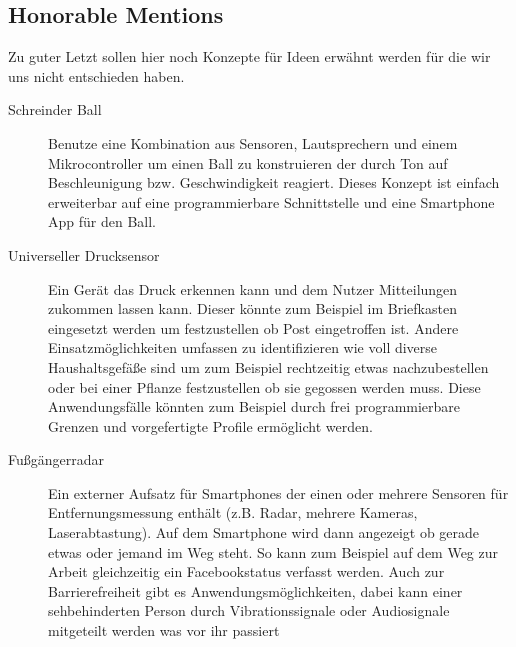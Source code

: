 \subsection{\glqq Honorable Mentions\grqq}
Zu guter Letzt sollen hier noch Konzepte für Ideen erwähnt werden für die wir uns nicht entschieden haben.
\begin{description}
	\item[Schreinder Ball] Benutze eine Kombination aus Sensoren, Lautsprechern und einem Mikrocontroller um einen Ball zu konstruieren der durch Ton auf Beschleunigung bzw. Geschwindigkeit reagiert. Dieses Konzept ist einfach erweiterbar auf eine programmierbare Schnittstelle und eine Smartphone App für den Ball.
	
	\item[Universeller Drucksensor] Ein Gerät das Druck erkennen kann und dem Nutzer Mitteilungen zukommen lassen kann. Dieser könnte zum Beispiel im Briefkasten eingesetzt werden um festzustellen ob Post eingetroffen ist. Andere Einsatzmöglichkeiten umfassen zu identifizieren wie voll diverse Haushaltsgefäße sind um zum Beispiel rechtzeitig etwas nachzubestellen oder bei einer Pflanze festzustellen ob sie gegossen werden muss. Diese Anwendungsfälle könnten zum Beispiel durch frei programmierbare Grenzen und vorgefertigte Profile ermöglicht werden.
	
	\item[Fußgängerradar] Ein externer Aufsatz für Smartphones der einen oder mehrere Sensoren für Entfernungsmessung enthält (z.B. Radar, mehrere Kameras, Laserabtastung). Auf dem Smartphone wird dann angezeigt ob gerade etwas oder jemand im Weg steht. So kann zum Beispiel auf dem Weg zur Arbeit gleichzeitig ein Facebookstatus verfasst werden. Auch zur Barrierefreiheit gibt es Anwendungsmöglichkeiten, dabei kann einer sehbehinderten Person durch Vibrationssignale oder Audiosignale mitgeteilt werden was vor ihr passiert
\end{description}